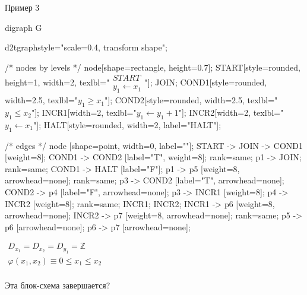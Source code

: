 \documentclass[hyperref={unicode=true}]{beamer}
\begin{document}
    \begin{frame}[fragile]{Пример 3}
    \begin{multicols}{2}
	\huge
	\begin{dot2tex}[options=-traw]
	digraph G{
		d2tgraphstyle="scale=0.4, transform shape";

		/* nodes by levels */
		node[shape=rectangle, height=0.7];
		START[style=rounded, height=1, width=2, texlbl="$\begin{matrix}START\\ y_1 \leftarrow x_1\end{matrix}$"];
		JOIN;
        COND1[style=rounded, width=2.5, texlbl="$y_1 \geq x_1$"];
        COND2[style=rounded, width=2.5, texlbl="$y_1 \leq x_2$"];
		INCR1[width=2, texlbl="$y_1 \leftarrow y_1 + 1$"];
		INCR2[width=2, texlbl="$y_1 \leftarrow x_1$"];
        HALT[style=rounded, width=2, label="HALT"];

		/* edges */
		node [shape=point, width=0, label=""];
		START -> JOIN -> COND1 [weight=8];
        COND1 -> COND2 [label="T", weight=8];
		{ rank=same; p1 -> JOIN; }
        { rank=same; COND1 -> HALT [label="F"]; }
		p1 -> p5 [weight=8, arrowhead=none];
		{ rank=same; p3 -> COND2 [label="T", arrowhead=none]; COND2 -> p4 [label="F", arrowhead=none]; }
		p3 -> INCR1 [weight=8];
		p4 -> INCR2 [weight=8];
		{ rank=same; INCR1; INCR2; }
		INCR1 -> p6 [weight=8, arrowhead=none];
		INCR2 -> p7 [weight=8, arrowhead=none];
		{ rank=same; p5 -> p6 [arrowhead=none]; p6 -> p7 [arrowhead=none]; }
        }
	\end{dot2tex}

	\normalsize

    $\begin{matrix}
    D_{x_1} = D_{x_2} = D_{y_1} = \mathbb{Z}\\
    \varphi(x_1, x_2) \equiv 0 \leq x_1 \leq x_2\\
    \end{matrix}$

    Эта блок-схема завершается?
    \end{multicols}
    \end{frame}
\end{document}
